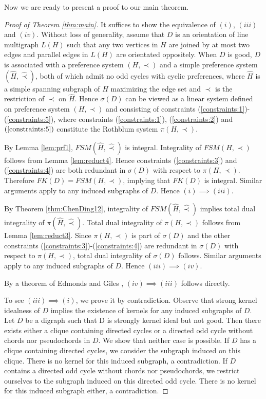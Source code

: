 \documentclass[11pt]{article}
\numberwithin{theorem}{section}
\begin{document}
Now we are ready to present a proof to our main theorem.

\begin{proof}[Proof of Theorem \ref{thm:main}]
It suffices to show the equivalence of $(i)$, $(iii)$ and $(iv)$. Without loss of generality, assume that $D$ is an orientation of line multigraph $L(H)$ such that any two vertices in $H$ are joined by at most two edges and parallel edges in $L(H)$ are orientated oppositely. When $D$ is good, $D$ is associated with a preference system $(H,\prec)$ and a simple preference system $(\hat{H},\hat\prec)$, both of which admit no odd cycles with cyclic preferences, where $\hat{H}$ is a simple spanning subgraph of $H$ maximizing the edge set and $\hat\prec$ is the restriction of $\prec$ on $\hat{H}$.
Hence $\sigma(D)$ can be viewed as a linear system defined on preference system $(H,\prec)$ and consisting of constraints (\ref{constraints:1})-(\ref{constraints:5}), where constraints (\ref{constraints:1}), (\ref{constraints:2}) and $(\ref{constraints:5})$ constitute the Rothblum system $\pi(H,\prec)$.

By Lemma \ref{lem:prf1}, $FSM(\hat{H},\hat\prec)$ is integral. Integrality of $FSM(H,\prec)$ follows from Lemma \ref{lem:reduct4}. Hence constraints (\ref{constraints:3}) and (\ref{constraints:4}) are both redundant in $\sigma(D)$ with respect to $\pi(H,\prec)$. Therefore $FK(D)=FSM(H,\prec)$, implying that $FK(D)$ is integral. Similar arguments apply to any induced subgraphs of $D$. Hence $(i)\implies (iii)$. 

By Theorem \ref{thm:ChenDing12}, integrality of $FSM(\hat{H},\hat\prec)$ implies total dual integrality of $\pi(\hat{H},\hat\prec)$. Total dual integrality of $\pi(H,\prec)$ follows from Lemma \ref{lem:reduct3}. Since $\pi(H,\prec)$ is part of $\sigma(D)$ and the other constraints (\ref{constraints:3})-(\ref{constraints:4}) are redundant in $\sigma(D)$ with respect to $\pi(H,\prec)$, total dual integrality of $\sigma(D)$ follows. Similar arguments apply to any induced subgraphs of $D$. Hence $(iii)\implies (iv)$.

By a theorem of Edmonds and Giles \cite{EdmoGile77}, $(iv)\implies (iii)$ follows directly.

To see $(iii)\implies (i)$, we prove it by contradiction. Observe that strong kernel idealness of  $D$ implies the existence of kernels for any induced subgraphs of $D$. Let $D$ be a digraph such that D is strongly kernel ideal but not good. Then there exists either a clique containing directed cycles or a directed odd cycle without chords nor pseudochords in $D$. We show that neither case is possible. If $D$ has a clique containing directed cycles, we consider the subgraph induced on this clique. There is no kernel for this induced subgraph, a contradiction. If $D$ contains a directed odd cycle without chords nor pseudochords, we restrict ourselves to the subgraph induced on this directed odd cycle. There is no kernel for this induced subgraph either, a contradiction.
\end{proof}




\nocite{Schr86}
\end{document}
